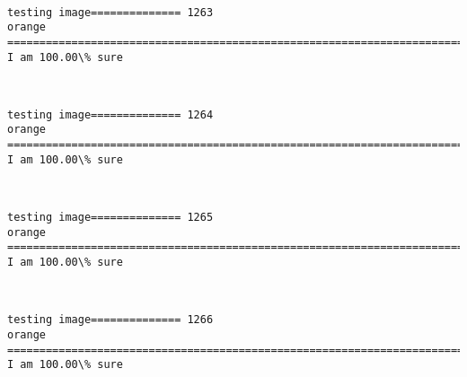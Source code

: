 \documentclass[11pt]{article}
\begin{document}
    \begin{center}
    \end{center}
    { \hspace*{\fill} \\}
    
    \begin{Verbatim}[commandchars=\\\{\}]
testing image============== 1263
orange
============================================================================
I am 100.00\% sure

    \end{Verbatim}

    \begin{center}
    \end{center}
    { \hspace*{\fill} \\}
    
    \begin{Verbatim}[commandchars=\\\{\}]
testing image============== 1264
orange
============================================================================
I am 100.00\% sure

    \end{Verbatim}

    \begin{center}
    \end{center}
    { \hspace*{\fill} \\}
    
    \begin{Verbatim}[commandchars=\\\{\}]
testing image============== 1265
orange
============================================================================
I am 100.00\% sure

    \end{Verbatim}

    \begin{center}
    \end{center}
    { \hspace*{\fill} \\}
    
    \begin{Verbatim}[commandchars=\\\{\}]
testing image============== 1266
orange
============================================================================
I am 100.00\% sure

    \end{Verbatim}
\end{document}
